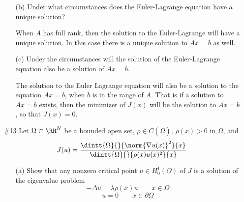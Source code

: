 \documentclass[11pt, oneside]{article}
\begin{document}
\begin{enumerate}
\begin{enumerate}
      \item[(b)]
        Under what circumstances does the Euler-Lagrange equation have a unique
        solution?

        When $A$ has full rank, then the solution to the Euler-Lagrange will
        have a unique solution.
        In this case there is a unique solution to $Ax = b$ as well.

      \item[(c)]
        Under the circumstances will the solution of the Euler-Lagrange equation
        also be a solution of $Ax = b$.

        The solution to the Euler Lagrange equation will also be a solution to
        the equation $Ax = b$, when $b$ is in the range of $A$.
        That is if a solution to $Ax = b$ exists, then the minimizer of $J(x)$
        will be the solution to $Ax = b$, so that $J(x) = 0$.
    \end{enumerate}

  \item[\#13] %
    Let $\Omega \subset \RR^N$ be a bounded open set,
    $\rho \in C(\overline{\Omega})$, $\rho(x) > 0$ in $\Omega$, and
    \[
      J(u) = \frac{\dintt{\Omega}{}{\norm{\nabla u(x)}^2}{x}}{\dintt{\Omega}{}{\rho(x)u(x)^2}{x}}
    \]
    \begin{enumerate}
      \item[(a)] %
        Show that any nonzero critical point $u \in H_0^1(\Omega)$ of $J$ is a
        solution of the eigenvalue problem
        \[
          -\Delta u = \lambda \rho(x) u \qquad x \in \Omega
        \]
        \[
          u = 0 \qquad x \in \partial \Omega
        \]


\end{enumerate}
\end{enumerate}
\end{document}
